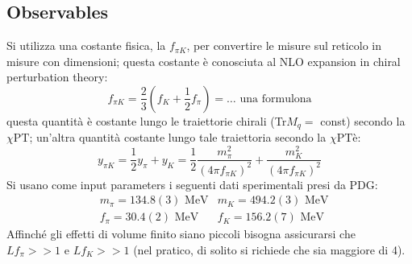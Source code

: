 \documentclass[12pt,a4paper,openright]{article}
\newcommand{\cpt}{$\chi\text{PT}$}
\newcommand{\mev}{\text{ MeV}}
\begin{document}
\subsection{Observables}
Si utilizza una costante fisica, la $f_{\pi K}$, per convertire le misure sul reticolo in misure con dimensioni; questa costante è conosciuta al NLO expansion in chiral perturbation theory:
\begin{equation}\label{eq:fpik}
  f_{\pi K} = \frac{2}{3}\left(f_K + \frac{1}{2}f_\pi\right) = \dots \text{ una formulona}
\end{equation}
questa quantità è costante lungo le traiettorie chirali (Tr$M_q=$ const) secondo la \cpt; un'altra quantità costante lungo tale traiettoria secondo la \cpt\space è:
\begin{equation*}
  y_{\pi K} = \frac{1}{2} y_\pi + y_K = \frac{1}{2}\frac{m_\pi^2}{(4\pi f_{\pi K})^2} + \frac{m_K^2}{(4\pi f_{\pi K})^2}
\end{equation*}
Si usano come input parameters i seguenti dati sperimentali presi da PDG:
\begin{equation*}
  \begin{aligned}
    & m_\pi = 134.8(3)\mev & m_K = 494.2(3)\mev \\
    & f_\pi = 30.4(2)\mev & f_K = 156.2(7) \mev
  \end{aligned}
\end{equation*}
Affinché gli effetti di volume finito siano piccoli bisogna assicurarsi che $Lf_\pi >> 1$ e $Lf_K >> 1$ (nel pratico, di solito si richiede che sia maggiore di 4).
\end{document}
